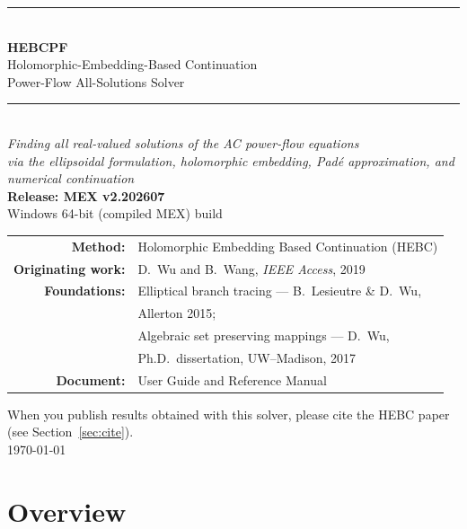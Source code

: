 \documentclass[11pt,a4paper]{article}
\begin{document}
\begin{titlepage}
\centering
\vspace*{2.2cm}
{\color{rule}\rule{\textwidth}{1.2pt}}\\[8pt]
{\Huge\bfseries HEBCPF}\\[10pt]
{\LARGE Holomorphic-Embedding-Based Continuation}\\[4pt]
{\LARGE Power-Flow All-Solutions Solver}\\[10pt]
{\color{rule}\rule{\textwidth}{1.2pt}}\\[18pt]
{\large\itshape Finding \emph{all} real-valued solutions of the AC power-flow equations}\\[6pt]
{\large\itshape via the ellipsoidal formulation, holomorphic embedding, Pad\'e approximation, and numerical continuation}\\[26pt]

{\large\bfseries Release: MEX v2.202607}\\[4pt]
{\large Windows 64-bit (compiled MEX) build}\\[30pt]

\begin{tabular}{rl}
\textbf{Method:} & Holomorphic Embedding Based Continuation (HEBC)\\[3pt]
\textbf{Originating work:} & D.\ Wu and B.\ Wang, \emph{IEEE Access}, 2019\\[6pt]
\textbf{Foundations:} & Elliptical branch tracing --- B.\ Lesieutre \& D.\ Wu,\\[1pt]
                      & Allerton 2015;\\[3pt]
                      & Algebraic set preserving mappings --- D.\ Wu,\\[1pt]
                      & Ph.D.\ dissertation, UW--Madison, 2017\\[6pt]
\textbf{Document:} & User Guide and Reference Manual\\
\end{tabular}

\vfill
{\small When you publish results obtained with this solver, please cite the HEBC
paper (see Section~\ref{sec:cite}).}\\[6pt]
{\small\today}
\end{titlepage}

\tableofcontents
\newpage

\section{Overview}
\end{document}
